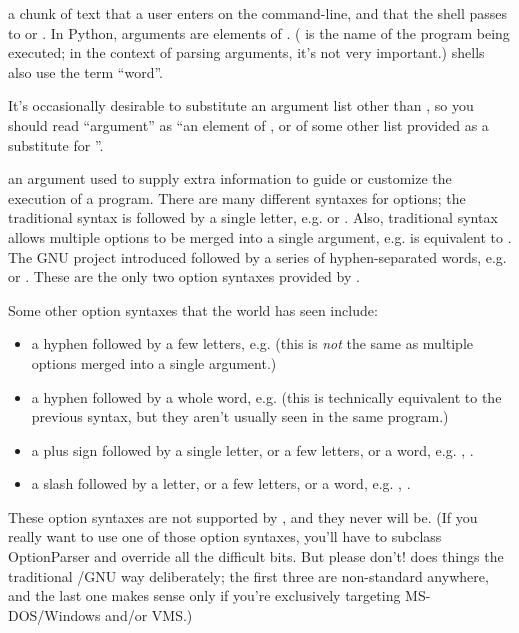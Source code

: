 \begin{definitions}
a chunk of text that a user enters on the command-line, and that the
shell passes to  or .  In
Python, arguments are elements of
. ( is the name of the program
being executed; in the context of parsing arguments, it's not very
important.)  \UNIX{} shells also use the term ``word''.

It's occasionally desirable to substitute an argument list other
than , so you should read ``argument'' as ``an element of
, or of some other list provided as a substitute for
''.

  an argument used to supply extra information to guide or customize
  the execution of a program.  There are many different syntaxes for
  options; the traditional \UNIX{} syntax is \programopt{-} followed by a
  single letter, e.g.  or .  Also,
  traditional \UNIX{} syntax allows multiple options to be merged into a
  single argument, e.g.   is equivalent to
  .  The GNU project introduced \longprogramopt{}
  followed by a series of hyphen-separated words,
  e.g.  or .  These are
  the only two option syntaxes provided by .

  Some other option syntaxes that the world has seen include:

\begin{itemize}
\item a hyphen followed by a few letters, e.g.  (this is
      \emph{not} the same as multiple options merged into a single
      argument.)
\item a hyphen followed by a whole word, e.g.  (this is
      technically equivalent to the previous syntax, but they aren't
      usually seen in the same program.)
\item a plus sign followed by a single letter, or a few letters,
      or a word, e.g. , .
\item a slash followed by a letter, or a few letters, or a word, e.g.
      , .
\end{itemize}

These option syntaxes are not supported by , and they
never will be.  (If you really want to use one of those option
syntaxes, you'll have to subclass OptionParser and override all the
difficult bits.  But please don't!   does things the
traditional \UNIX/GNU way deliberately; the first three are
non-standard anywhere, and the last one makes sense only if you're
exclusively targeting MS-DOS/Windows and/or VMS.)


\end{definitions}
